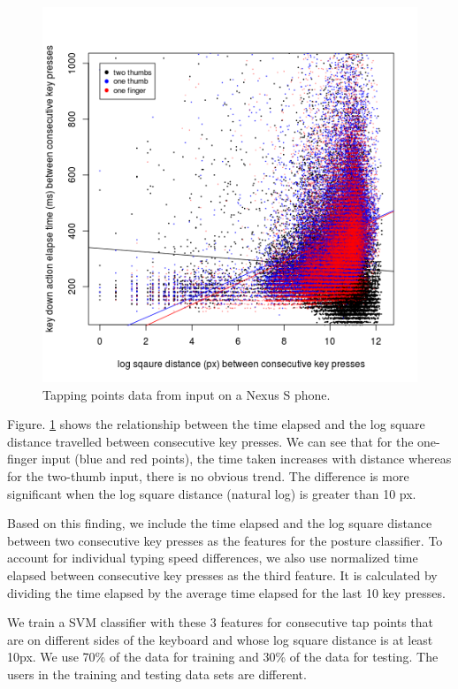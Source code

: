 \documentclass{sigchi}
\begin{document}
\begin{figure}[tb]
  \centering
  \includegraphics[width=0.9\columnwidth]{figures/time-distance.png}
  \caption{Tapping points data from input on a Nexus S phone.}
  \label{fig:time-distance}
\end{figure}

Figure. \ref{fig:time-distance} shows the relationship between the time elapsed 
and the log square distance travelled between consecutive key presses. We can
see that for the one-finger input (blue and red points), the time taken
increases with distance whereas for the two-thumb input, there is no obvious
trend. The difference is more significant when the log square distance (natural
log) is greater than 10 px.

Based on this finding, we include the time elapsed and the log square distance
between two consecutive key presses as the features for the posture classifier. 
To account for individual typing speed differences, we also use normalized time 
elapsed between consecutive key presses as the third feature. It is calculated 
by dividing the time elapsed by the average time elapsed for the last 10 key
presses.

We train a SVM classifier with these 3 features for consecutive tap points that 
are on different sides of the keyboard and whose log square distance is at least
10px. We use 70\% of the data for training and 30\% of the
data for testing. The users in the training and testing data sets are different.
\end{document}
